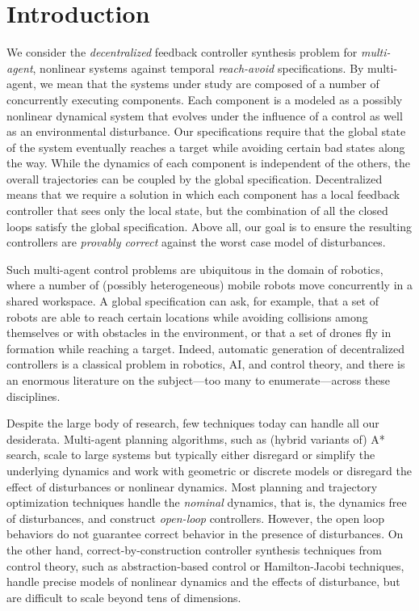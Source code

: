 
\section{Introduction}



We consider the \emph{decentralized} feedback controller synthesis problem for \emph{multi-agent}, nonlinear systems against temporal 
\emph{reach-avoid} specifications.
%
By multi-agent, we mean that the systems under study are composed of a number of concurrently executing components.
Each component is a modeled as a possibly nonlinear dynamical system that evolves under the influence of a control as well as an environmental
disturbance.
Our specifications require that the global state of the system eventually reaches a target while avoiding certain bad states along the way.
While the dynamics of each component is independent of the others, the overall trajectories can be coupled by the global specification.
Decentralized means that we require a solution in which each component has a local feedback controller that sees only the local
state, but the combination of all the closed loops satisfy the global specification.
Above all, our goal is to ensure the resulting controllers are \emph{provably correct} against the worst case model of disturbances.

Such multi-agent control problems are ubiquitous in the domain of robotics, where a number of 
(possibly heterogeneous) mobile robots move concurrently in a shared workspace.
A global specification can ask, for example, that a set of robots are able to reach certain locations while avoiding collisions among themselves
or with obstacles in the environment,
or that a set of drones fly in formation while reaching a target.
Indeed, automatic generation of decentralized controllers is a classical problem in robotics, AI, and control theory, 
and there is an enormous literature on the subject---too many to enumerate---across these disciplines.

Despite the large body of research, few techniques today can handle all our desiderata.
Multi-agent planning algorithms, such as (hybrid variants of) A* search, scale to large systems but typically either disregard or simplify the 
underlying dynamics and work with geometric or discrete models or disregard the effect of disturbances or nonlinear dynamics.
Most planning and trajectory optimization techniques handle the \emph{nominal} dynamics, that is, the dynamics free of disturbances,
and construct \emph{open-loop} controllers.
However, the open loop behaviors do not guarantee correct behavior in the presence of disturbances.
On the other hand, correct-by-construction controller synthesis techniques from control theory, 
such as abstraction-based control or Hamilton-Jacobi techniques,
handle precise models of nonlinear dynamics and the effects of disturbance, but are difficult to scale beyond tens of dimensions.

